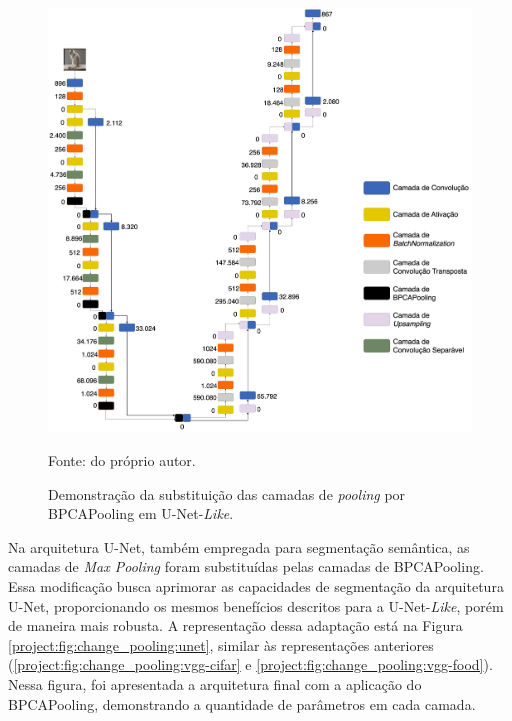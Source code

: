 \begin{figure}[H]
    \centering
    \caption{Demonstração da substituição das camadas de \textit{pooling} por BPCAPooling em U-Net-\textit{Like}.}
    \includegraphics[width=1\textwidth]{recursos/imagens/project/unet-like-with-bpca-food.png}
    \label{project:fig:change_pooling:unet-like}

    Fonte: do próprio autor.
\end{figure}

Na arquitetura U-Net, também empregada para segmentação semântica, as camadas de \textit{Max Pooling} foram substituídas pelas camadas de BPCAPooling. Essa modificação busca aprimorar as capacidades de segmentação da arquitetura U-Net, proporcionando os mesmos benefícios descritos para a U-Net-\textit{Like}, porém de maneira mais robusta. A representação dessa adaptação está na Figura \ref{project:fig:change_pooling:unet}, similar às representações anteriores (\ref{project:fig:change_pooling:vgg-cifar} e \ref{project:fig:change_pooling:vgg-food}). Nessa figura, foi apresentada a arquitetura final com a aplicação do BPCAPooling, demonstrando a quantidade de parâmetros em cada camada.

